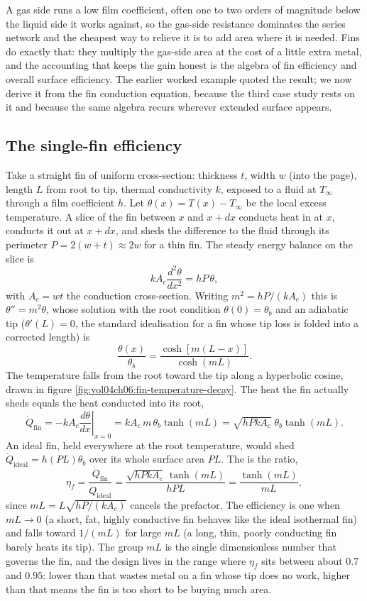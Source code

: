 A gas side runs a low film coefficient, often one to two orders of magnitude
below the liquid side it works against, so the gas-side resistance dominates the
series network and the cheapest way to relieve it is to add area where it is
needed. Fins do exactly that: they multiply the gas-side area at the cost of a
little extra metal, and the accounting that keeps the gain honest is the algebra
of fin efficiency and overall surface efficiency. The earlier worked example
quoted the result; we now derive it from the fin conduction equation, because the
third case study rests on it and because the same algebra recurs wherever
extended surface appears.

\subsection{The single-fin efficiency}

Take a straight fin of uniform cross-section: thickness $t$, width $w$ (into the
page), length $L$ from root to tip, thermal conductivity $k$, exposed to a fluid
at $T_\infty$ through a film coefficient $h$. Let $\theta(x) = T(x) - T_\infty$ be
the local excess temperature. A slice of the fin between $x$ and $x + dx$
conducts heat in at $x$, conducts it out at $x + dx$, and sheds the difference to
the fluid through its perimeter $P = 2(w + t) \approx 2w$ for a thin fin. The
steady energy balance on the slice is
\[
k A_c \frac{d^2\theta}{dx^2} = h P\,\theta,
\]
with $A_c = wt$ the conduction cross-section. Writing $m^2 = hP/(kA_c)$ this is
$\theta'' = m^2\theta$, whose solution with the root condition $\theta(0) =
\theta_b$ and an adiabatic tip ($\theta'(L) = 0$, the standard idealisation for a
fin whose tip loss is folded into a corrected length) is
\[
\frac{\theta(x)}{\theta_b} = \frac{\cosh[m(L - x)]}{\cosh(mL)}.
\]
The temperature falls from the root toward the tip along a hyperbolic cosine,
drawn in figure \ref{fig:vol04ch06:fin-temperature-decay}. The heat the fin
actually sheds equals the heat conducted into its root,
\[
\dot{Q}_{\text{fin}} = -kA_c \left.\frac{d\theta}{dx}\right|_{x=0}
= kA_c\, m\,\theta_b \tanh(mL) = \sqrt{hPkA_c}\;\theta_b \tanh(mL).
\]
An ideal fin, held everywhere at the root temperature, would shed
$\dot{Q}_{\text{ideal}} = h(PL)\theta_b$ over its whole surface area $PL$. The
 is the ratio,
\[
\eta_f = \frac{\dot{Q}_{\text{fin}}}{\dot{Q}_{\text{ideal}}}
= \frac{\sqrt{hPkA_c}\,\tanh(mL)}{hPL}
= \frac{\tanh(mL)}{mL},
\]
since $mL = L\sqrt{hP/(kA_c)}$ cancels the prefactor. The efficiency is one when
$mL \to 0$ (a short, fat, highly conductive fin behaves like the ideal isothermal
fin) and falls toward $1/(mL)$ for large $mL$ (a long, thin, poorly conducting
fin barely heats its tip). The group $mL$ is the single dimensionless number that
governs the fin, and the design lives in the range where $\eta_f$ sits between
about $0.7$ and $0.95$: lower than that wastes metal on a fin whose tip does no
work, higher than that means the fin is too short to be buying much area.

